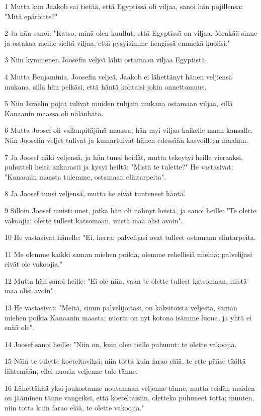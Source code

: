 \par 1 Mutta kun Jaakob sai tietää, että Egyptissä oli viljaa, sanoi hän pojillensa: "Mitä epäröitte?"
\par 2 Ja hän sanoi: "Katso, minä olen kuullut, että Egyptissä on viljaa. Menkää sinne ja ostakaa meille sieltä viljaa, että pysyisimme hengissä emmekä kuolisi."
\par 3 Niin kymmenen Joosefin veljeä lähti ostamaan viljaa Egyptistä.
\par 4 Mutta Benjaminia, Joosefin veljeä, Jaakob ei lähettänyt hänen veljiensä mukana, sillä hän pelkäsi, että häntä kohtaisi jokin onnettomuus.
\par 5 Niin Israelin pojat tulivat muiden tulijain mukana ostamaan viljaa, sillä Kanaanin maassa oli nälänhätä.
\par 6 Mutta Joosef oli vallanpitäjänä maassa; hän myi viljaa kaikelle maan kansalle. Niin Joosefin veljet tulivat ja kumartuivat hänen edessään kasvoilleen maahan.
\par 7 Ja Joosef näki veljensä, ja hän tunsi heidät, mutta tekeytyi heille vieraaksi, puhutteli heitä ankarasti ja kysyi heiltä: "Mistä te tulette?" He vastasivat: "Kanaanin maasta tulemme, ostamaan elintarpeita".
\par 8 Ja Joosef tunsi veljensä, mutta he eivät tunteneet häntä.
\par 9 Silloin Joosef muisti unet, jotka hän oli nähnyt heistä, ja sanoi heille: "Te olette vakoojia; olette tulleet katsomaan, mistä maa olisi avoin".
\par 10 He vastasivat hänelle: "Ei, herra; palvelijasi ovat tulleet ostamaan elintarpeita.
\par 11 Me olemme kaikki saman miehen poikia, olemme rehellisiä miehiä; palvelijasi eivät ole vakoojia."
\par 12 Mutta hän sanoi heille: "Ei ole niin, vaan te olette tulleet katsomaan, mistä maa olisi avoin".
\par 13 He vastasivat: "Meitä, sinun palvelijoitasi, on kaksitoista veljestä, saman miehen poikia Kanaanin maasta; nuorin on nyt kotona isämme luona, ja yhtä ei enää ole".
\par 14 Joosef sanoi heille: "Niin on, kuin olen teille puhunut: te olette vakoojia.
\par 15 Näin te tulette koeteltaviksi: niin totta kuin farao elää, te ette pääse täältä lähtemään, ellei nuorin veljenne tule tänne.
\par 16 Lähettäkää yksi joukostanne noutamaan veljenne tänne, mutta teidän muiden on jääminen tänne vangeiksi, että koeteltaisiin, oletteko puhuneet totta; muuten, niin totta kuin farao elää, te olette vakoojia."
